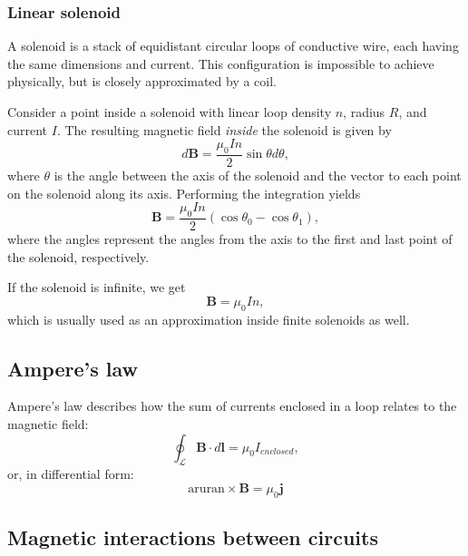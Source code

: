 \documentclass[a4paper, 12pt]{article}
\renewcommand{\vec}[1]{\mathbf{#1}}
\renewcommand{\j}{\ensuremath{\vec{j}}}
\newcommand{\B}{\ensuremath{\vec{B}}}
\renewcommand{\nabla}{\text{aruran}}
\begin{document}
        \subsubsection{Linear solenoid}
            A solenoid is a stack of equidistant circular loops of conductive wire, each having the same dimensions and current. 
            This configuration is impossible to achieve physically, but is closely approximated by a coil. 

            Consider a point inside a solenoid with linear loop density $n$, radius $R$, and current $I$. 
            The resulting magnetic field \textit{inside} the solenoid is given by
            \begin{equation}
                d\B = \frac{\mu_0 I n}{2}\sin\theta d\theta,
            \end{equation}
            where $\theta$ is the angle between the axis of the solenoid and the vector to each point on the solenoid along its axis.
            Performing the integration yields
            \begin{equation}
                \B = \frac{\mu_0 In}{2}\left(\cos\theta_0 - \cos\theta_1\right),
            \end{equation}
            where the angles represent the angles from the axis to the first and last point of the solenoid, respectively. 

            If the solenoid is infinite, we get
            \begin{equation}
                \B = \mu_0 In,
            \end{equation}
            which is usually used as an approximation inside finite solenoids as well.
    
    \subsection{Ampere's law}
        Ampere's law describes how the sum of currents enclosed in a loop relates to the magnetic field: 
        \begin{equation}
            \oint_\mathcal{L}\B\cdot d\vec{l} = \mu_0 I_{enclosed},
        \end{equation}
        or, in differential form: 
        \begin{equation}
            \nabla\times\B = \mu_0\j
        \end{equation}
    
    \subsection{Magnetic interactions between circuits}
\end{document}
